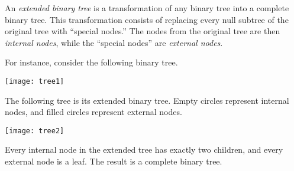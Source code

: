 \documentclass[12pt]{article}
\begin{document}
An \emph{extended binary tree} is a transformation of any binary tree into a complete binary tree.  This transformation consists of replacing every null subtree of the original tree with ``special nodes.''  The nodes from the original tree are then \emph{internal nodes}, while the ``special nodes'' are \emph{external nodes}.

For instance, consider the following binary tree.

\begin{center}
\texttt{[image: tree1]}
\end{center}

The following tree is its extended binary tree.  Empty circles represent internal nodes, and filled circles represent external nodes.

\begin{center}
\texttt{[image: tree2]}
\end{center}

Every internal node in the extended tree has exactly two children, and every external node is a leaf.  The result is a complete binary tree.
\end{document}
